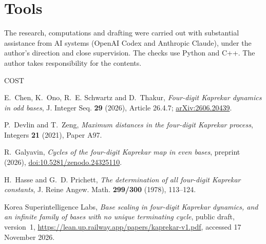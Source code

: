 \documentclass[11pt]{amsart}
\theoremstyle{remark}
\begin{document}
\section*{Tools}
The research, computations and drafting were carried out with substantial assistance from AI systems (OpenAI Codex and Anthropic Claude), under the author's direction and close supervision. The checks use Python and C++. The author takes responsibility for the contents.

\begingroup\raggedright
\begin{thebibliography}{COST}

E.~Chen, K.~Ono, R.~E. Schwartz and D.~Thakur, \emph{Four-digit Kaprekar dynamics in odd bases}, J. Integer Seq. \textbf{29} (2026), Article 26.4.7; \href{https://arxiv.org/abs/2606.20439}{arXiv:2606.20439}.

P.~Devlin and T.~Zeng, \emph{Maximum distances in the four-digit Kaprekar process}, Integers \textbf{21} (2021), Paper A97.

R.~Galyavin, \emph{Cycles of the four-digit Kaprekar map in even bases}, preprint (2026), \href{https://doi.org/10.5281/zenodo.24325110}{doi:10.5281/zenodo.24325110}.

H.~Hasse and G.~D. Prichett, \emph{The determination of all four-digit Kaprekar constants}, J. Reine Angew. Math. \textbf{299/300} (1978), 113--124.

Korea Superintelligence Labs, \emph{Base scaling in four-digit Kaprekar dynamics, and an infinite family of bases with no unique terminating cycle}, public draft, version~1, \url{https://lean.up.railway.app/papers/kaprekar-v1.pdf}, accessed 17 November 2026.

\end{thebibliography}
\endgroup
\end{document}
